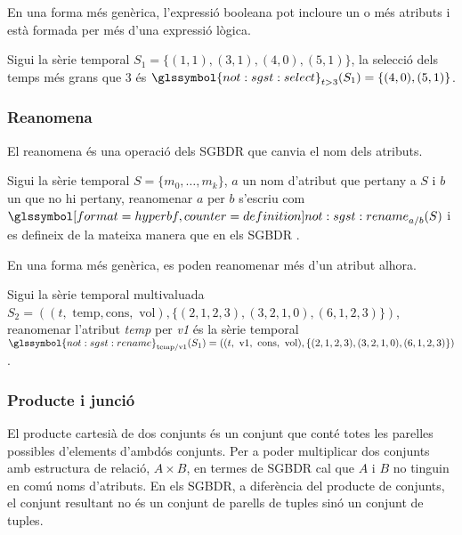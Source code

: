 En una forma més genèrica, l'expressió booleana pot incloure un o més
atributs i està formada per més d'una expressió lògica.


\begin{example}
  Sigui la sèrie temporal $S_1=\{(1,1),(3,1),(4,0),(5,1)\}$, la
  selecció dels temps més grans que $3$ és
  $\glssymbol{not:sgst:select}_{t>3}(S_1) = \{(4,0),(5,1)\}$.
\end{example}




\subsubsection{Reanomena}

El reanomena és una operació dels \gls{SGBDR} que canvia el nom dels
atributs. 


\begin{definition}[reanomena]
  Sigui la sèrie temporal $S=\{ m_0,\dotsc,m_k\}$, $a$ un nom
  d'atribut que pertany a $S$ i $b$ un que no hi pertany, reanomenar
  $a$ per $b$ s'escriu com $\glssymboldef{not:sgst:rename}_{a/b} (S)$
  i es defineix de la mateixa manera que en els
  \gls{SGBDR} \parencite[cap.~7]{date04:introduction8}.
\end{definition}

En una forma més genèrica, es poden reanomenar més d'un atribut
alhora.

\begin{example}
  Sigui la sèrie temporal multivaluada $S_2 = ( (t,\text{ temp},\text{
    cons},\text{ vol}),\{ (2,1,2,3), (3,2,1,0), (6,1,2,3) \})$, reanomenar 
  l'atribut \emph{temp} per \emph{v1} és la sèrie temporal
  $\glssymbol{not:sgst:rename}_{\text{temp}/\text{v1}}(S_1) = ( (t,\text{ v1},\text{
    cons},\text{ vol}),\{ (2,1,2,3), (3,2,1,0), (6,1,2,3) \})$.
\end{example}



\subsubsection{Producte i junció}

El producte cartesià de dos conjunts és un conjunt que conté totes les
parelles possibles d'elements d'ambdós conjunts.  Per a poder
multiplicar dos conjunts amb estructura de relació, $A \times B$, en
termes de \gls{SGBDR} cal que $A$ i $B$ no tinguin en comú noms
d'atributs.  En els \gls{SGBDR}, a diferència del producte de conjunts, el
conjunt resultant no és un conjunt de parells de tuples sinó un
conjunt de tuples.

